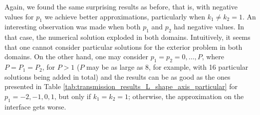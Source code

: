 


Again, we found the same surprising results as before, that is, with negative values for \(p_1\) we achieve better approximations, particularly when \(k_1 \neq k_2 = 1\). An interesting observation was made when both \(p_1\) and \(p_2\) had negative values. In that case, the numerical solution exploded in both domains. Intuitively, it seems that one cannot consider particular solutions for the exterior problem in both domains. On the other hand, one may consider \(p_1 = p_2 = 0, \dots, P\), where \(P=P_1=P_2\), for \(P > 1\) (\(P\) may be as large as 8, for example, with 16 particular solutions being added in total) and the results can be as good as the ones presented in Table \ref{tab:transmission_results_L_shape_axis_particular} for \(p_1=-2, -1, 0, 1\), but only if \(k_1=k_2=1\); otherwise, the approximation on the interface gets worse. 

